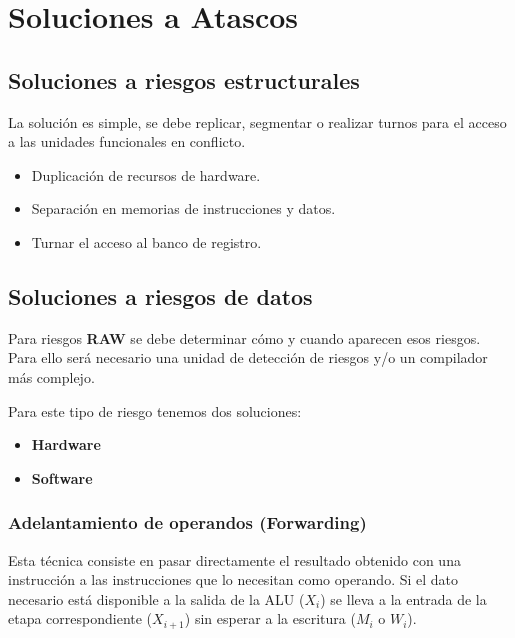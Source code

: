 \section{Soluciones a Atascos}

\subsection{Soluciones a riesgos estructurales}

La solución es simple, se debe replicar, segmentar o realizar turnos para el acceso a las unidades funcionales en conflicto.

\begin{itemize}
  \item Duplicación de recursos de hardware.
  \item Separación en memorias de instrucciones y datos.
  \item Turnar el acceso al banco de registro.
\end{itemize}

\subsection{Soluciones a riesgos de datos}

Para riesgos \textbf{RAW} se debe determinar cómo y cuando aparecen esos riesgos. Para ello será necesario una unidad de detección de riesgos y/o un compilador más complejo.

Para este tipo de riesgo tenemos dos soluciones:

\begin{itemize}
  \item \textbf{Hardware}
  \item \textbf{Software}
\end{itemize}

\subsubsection{Adelantamiento de operandos (Forwarding)}

Esta técnica consiste en pasar directamente el resultado obtenido con una instrucción a las instrucciones que lo necesitan como operando. Si el dato necesario está disponible a la salida de la ALU ($X_i$) se lleva a la entrada de la etapa correspondiente ($X_{i+1}$) sin esperar a la escritura ($M_i$ o $W_i$).


